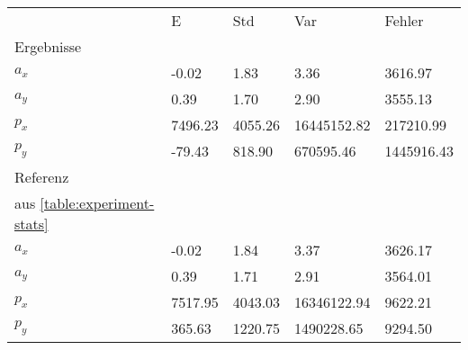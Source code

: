 \begin{tabular}{l|l|l|l|l}

     & E   & Std    & Var    & Fehler \\
\hhline{=|=|=|=|=}

Ergebnisse & & & & \\
$a_x$  &        -0.02 &         1.83 &         3.36 &      3616.97 \\
$a_y$  &         0.39 &         1.70 &         2.90 &      3555.13 \\
$p_x$  &      7496.23 &      4055.26 &  16445152.82 &    217210.99 \\
$p_y$  &       -79.43 &       818.90 &    670595.46 &   1445916.43 \\

\hline
Referenz & & & & \\
aus \ref{table:experiment-stats} & & & & \\
$a_x$  &        -0.02 &         1.84 &         3.37 &      3626.17 \\
$a_y$  &         0.39 &         1.71 &         2.91 &      3564.01 \\
$p_x$  &      7517.95 &      4043.03 &  16346122.94 &      9622.21 \\
$p_y$  &       365.63 &      1220.75 &   1490228.65 &      9294.50 \\
\end{tabular}
